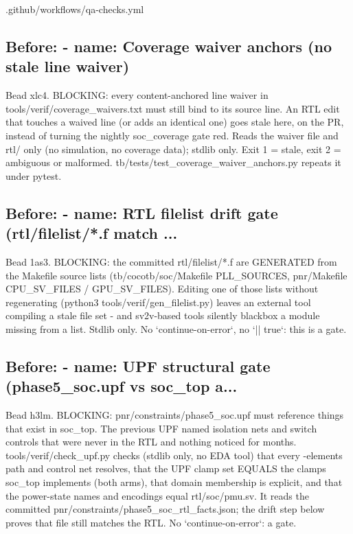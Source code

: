 \begin{relocated}{.github/workflows/qa-checks.yml}
\subsection*{Before: - name: Coverage waiver anchors (no stale line waiver)}

\begin{textblock}
Bead xlc4. BLOCKING: every content-anchored line waiver in tools/verif/coverage_waivers.txt must
still bind to its source line. An RTL edit that touches a waived line (or adds an identical
one) goes stale here, on the PR, instead of turning the nightly soc_coverage gate red. Reads
the waiver file and rtl/ only (no simulation, no coverage data); stdlib only. Exit 1 = stale,
exit 2 = ambiguous or malformed. tb/tests/test_coverage_waiver_anchors.py repeats it under pytest.
\end{textblock}

\subsection*{Before: - name: RTL filelist drift gate (rtl/filelist/*.f match ...}

\begin{textblock}
Bead 1as3. BLOCKING: the committed rtl/filelist/*.f are GENERATED from the Makefile source
lists (tb/cocotb/soc/Makefile PLL_SOURCES, pnr/Makefile CPU_SV_FILES / GPU_SV_FILES). Editing
one of those lists without regenerating (python3 tools/verif/gen_filelist.py) leaves an
external tool compiling a stale file set - and sv2v-based tools silently blackbox a module
missing from a list. Stdlib only. No `continue-on-error`, no `|| true`: this is a gate.
\end{textblock}

\subsection*{Before: - name: UPF structural gate (phase5\_soc.upf vs soc\_top a...}

\begin{textblock}
Bead h3lm. BLOCKING: pnr/constraints/phase5_soc.upf must reference things that exist in soc_top.
The previous UPF named isolation nets and switch controls that were never in the RTL and nothing
noticed for months. tools/verif/check_upf.py checks (stdlib only, no EDA tool) that every
-elements path and control net resolves, that the UPF clamp set EQUALS the clamps soc_top
implements (both arms), that domain membership is explicit, and that the power-state names and
encodings equal rtl/soc/pmu.sv. It reads the committed pnr/constraints/phase5_soc_rtl_facts.json;
the drift step below proves that file still matches the RTL. No `continue-on-error`: a gate.
\end{textblock}

\end{relocated}

